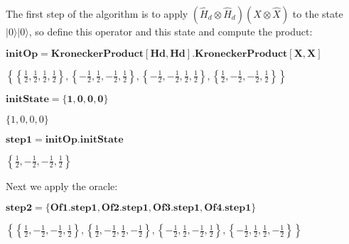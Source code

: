 The first step of the algorithm is to apply \((\hat{H}_d \otimes \hat{H}_d)(\hat{X} \otimes \hat{X})\) to the state \(|0\rangle|0\rangle\), so define this operator and this state and compute the
product:

\begin{doublespace}
\noindent\(\pmb{\text{initOp} = \text{KroneckerProduct}[\text{Hd}, \text{Hd}].\text{KroneckerProduct}[X,X]}\)
\end{doublespace}

\begin{doublespace}
\noindent\(\left\{\left\{\frac{1}{2},\frac{1}{2},\frac{1}{2},\frac{1}{2}\right\},\left\{-\frac{1}{2},\frac{1}{2},-\frac{1}{2},\frac{1}{2}\right\},\left\{-\frac{1}{2},-\frac{1}{2},\frac{1}{2},\frac{1}{2}\right\},\left\{\frac{1}{2},-\frac{1}{2},-\frac{1}{2},\frac{1}{2}\right\}\right\}\)
\end{doublespace}

\begin{doublespace}
\noindent\(\pmb{\text{initState} = \{1, 0, 0, 0\}}\)
\end{doublespace}

\begin{doublespace}
\noindent\(\{1,0,0,0\}\)
\end{doublespace}

\begin{doublespace}
\noindent\(\pmb{\text{step1}=\text{initOp}.\text{initState}}\)
\end{doublespace}

\begin{doublespace}
\noindent\(\left\{\frac{1}{2},-\frac{1}{2},-\frac{1}{2},\frac{1}{2}\right\}\)
\end{doublespace}

Next we apply the oracle:

\begin{doublespace}
\noindent\(\pmb{\text{step2} = \{\text{Of1}.\text{step1}, \text{Of2}.\text{step1}, \text{Of3}.\text{step1}, \text{Of4}.\text{step1}\}}\)
\end{doublespace}

\begin{doublespace}
\noindent\(\left\{\left\{\frac{1}{2},-\frac{1}{2},-\frac{1}{2},\frac{1}{2}\right\},\left\{\frac{1}{2},-\frac{1}{2},\frac{1}{2},-\frac{1}{2}\right\},\left\{-\frac{1}{2},\frac{1}{2},-\frac{1}{2},\frac{1}{2}\right\},\left\{-\frac{1}{2},\frac{1}{2},\frac{1}{2},-\frac{1}{2}\right\}\right\}\)
\end{doublespace}

